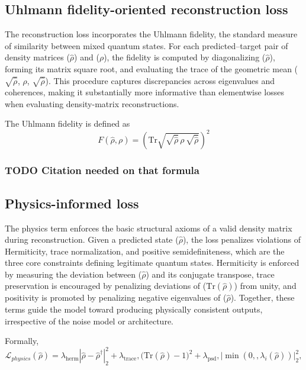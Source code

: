 \documentclass[11pt]{article}
\begin{document}
\subsection{Uhlmann fidelity-oriented reconstruction loss}
\label{sec:orga676514}
The reconstruction loss incorporates the Uhlmann fidelity, the standard measure of similarity between mixed quantum states. For each predicted–target pair of density matrices (\(\hat{\rho}\)) and (\(\rho\)), the fidelity is computed by diagonalizing (\(\hat{\rho}\)), forming its matrix square root, and evaluating the trace of the geometric mean (\(\sqrt{\hat{\rho}}\), \(\rho\), \(\sqrt{\hat{\rho}}\)). This procedure captures discrepancies across eigenvalues and coherences, making it substantially more informative than elementwise losses when evaluating density-matrix reconstructions.

The Uhlmann fidelity is defined as
$$
F(\hat{\rho}, \rho)
= \left( \mathrm{Tr}\sqrt{\sqrt{\hat{\rho}}\,\rho\,\sqrt{\hat{\rho}}}\right)^2 
$$
\subsubsection{{\bfseries\sffamily TODO} Citation needed on that formula}
\label{sec:orgbddb760}
\subsection{Physics-informed loss}
\label{sec:org1be2024}

The physics term enforces the basic structural axioms of a valid density matrix during reconstruction. Given a predicted state (\(\hat{\rho}\)), the loss penalizes violations of Hermiticity, trace normalization, and positive semidefiniteness, which are the three core constraints defining legitimate quantum states. Hermiticity is enforced by measuring the deviation between (\(\hat{\rho}\)) and its conjugate transpose, trace preservation is encouraged by penalizing deviations of (\(\mathrm{Tr}(\hat{\rho})\)) from unity, and positivity is promoted by penalizing negative eigenvalues of (\(\hat{\rho}\)). Together, these terms guide the model toward producing physically consistent outputs, irrespective of the noise model or architecture.

Formally, 
$$
\mathcal{L}_{physics}(\hat{\rho})
= \lambda_{\mathrm{herm}} \left|\hat{\rho} - \hat{\rho}^\dagger\right|_2^2 +
\lambda_{\mathrm{trace}},\big(\mathrm{Tr}(\hat{\rho}) - 1\big)^2 +
\lambda_{\mathrm{psd}},\big| \min(0,, \lambda_i(\hat{\rho})) \big|_2^2 ,
$$
\end{document}
